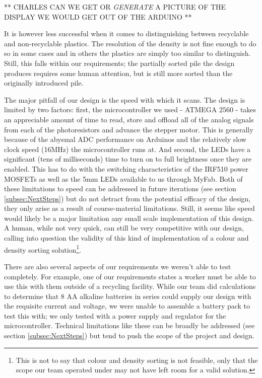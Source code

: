 \documentclass[12pt]{article}
\begin{document}
\begin{multicols*}{2}
            ** CHARLES CAN WE GET OR \textit{GENERATE} A PICTURE OF THE DISPLAY WE WOULD GET OUT OF THE ARDUINO **

            It is however less successful when it comes to distinguishing between recyclable and non-recyclable plastics. The resolution of the density is not fine enough to do so in some cases and in others the plastics are simply too similar to distinguish. Still, this falls within our requirements; the partially sorted pile the design produces requires some human attention, but is still more sorted than the originally introduced pile. 

            The major pitfall of our design is the speed with which it scans. The design is limited by two factors: first, the microcontroller we used - ATMEGA 2560 - takes an appreciable amount of time to read, store and offload all of the analog signals from each of the photoresistors and advance the stepper motor. This is generally because of the abysmal ADC performance on Arduinos and the relatively slow clock speed (16MHz) the microcontroller runs at. And second, the LEDs have a significant (tens of milliseconds) time to turn on to full brightness once they are enabled. This has to do with the switching characteristics of the IRF510 power MOSFETs as well as the 5mm LEDs available to us through MyFab. Both of these limitations to speed can be addressed in future iterations (see section \ref{subsec:NextSteps}) but do not detract from the potential efficacy of the design, they only arise as a result of course-material limitations. Still, it seems like speed would likely be a major limitation any small scale implementation of this design. A human, while not very quick, can still be very competitive with our design, calling into question the validity of this kind of implementation of a colour and density sorting solution\footnote{This is not to say that colour and density sorting is not feasible, only that the scope our team operated under may not have left room for a valid solution.}.   

            There are also several aspects of our requirements we weren't able to test completely. For example, one of our requirements states a worker must be able to use this with them outside of a recycling facility. While our team did calculations to determine that 8 AA alkaline batteries in series could supply our design with the requisite current and voltage, we were unable to assemble a battery pack to test this with; we only tested with a power supply and regulator for the microcontroller. Technical limitations like these can be broadly be addressed (see section \ref{subsec:NextSteps}) but tend to push the scope of the project and design.           
            

\end{multicols*}
\end{document}
